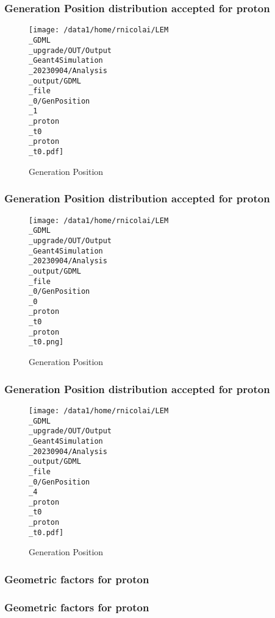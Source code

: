 \documentclass[8pt]{beamer}
\begin{document}
            \begin{frame}
                \frametitle{Generation Position distribution accepted for proton}
            
        \begin{figure}[h]
            \centering
            \texttt{[image: /data1/home/rnicolai/LEM\\\_GDML\\\_upgrade/OUT/Output\\\_Geant4Simulation\\\_20230904/Analysis\\\_output/GDML\\\_file\\\_0/GenPosition\\\_1\\\_proton\\\_t0\\\_proton\\\_t0.pdf]}
            \caption{Generation Position}
        \end{figure}
        
            \end{frame}
            
            \begin{frame}
                \frametitle{Generation Position distribution accepted for proton}
            
        \begin{figure}[h]
            \centering
            \texttt{[image: /data1/home/rnicolai/LEM\\\_GDML\\\_upgrade/OUT/Output\\\_Geant4Simulation\\\_20230904/Analysis\\\_output/GDML\\\_file\\\_0/GenPosition\\\_0\\\_proton\\\_t0\\\_proton\\\_t0.png]}
            \caption{Generation Position}
        \end{figure}
        
            \end{frame}
            
            \begin{frame}
                \frametitle{Generation Position distribution accepted for proton}
            
        \begin{figure}[h]
            \centering
            \texttt{[image: /data1/home/rnicolai/LEM\\\_GDML\\\_upgrade/OUT/Output\\\_Geant4Simulation\\\_20230904/Analysis\\\_output/GDML\\\_file\\\_0/GenPosition\\\_4\\\_proton\\\_t0\\\_proton\\\_t0.pdf]}
            \caption{Generation Position}
        \end{figure}
        
            \end{frame}
            
            \begin{frame}
                \frametitle{Geometric factors for proton}
            
            \end{frame}
            
            \begin{frame}
                \frametitle{Geometric factors for proton}
            
            \end{frame}
            
\end{document}
